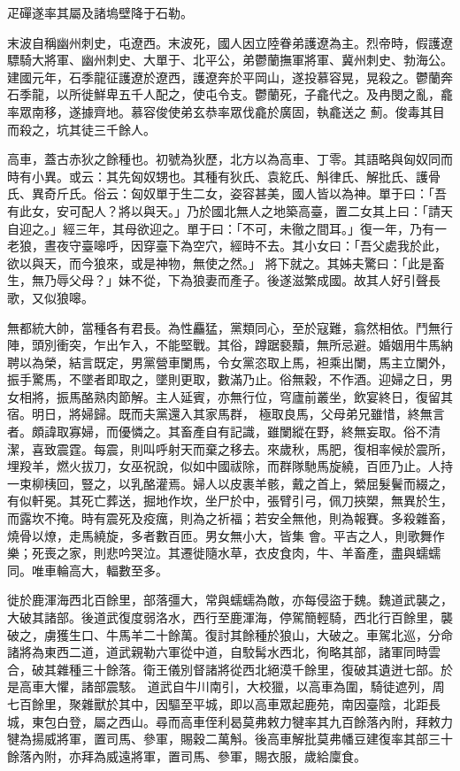 \begin{pinyinscope}
 疋磾遂率其屬及諸塢壁降于石勒。



 末波自稱幽州刺史，屯遼西。末波死，國人因立陸眷弟護遼為主。烈帝時，假護遼驃騎大將軍、幽州刺史、大單于、北平公，弟鬱蘭撫軍將軍、冀州刺史、勃海公。建國元年，石季龍征護遼於遼西，護遼奔於平岡山，遂投慕容晃，晃殺之。鬱蘭奔石季龍，以所徙鮮卑五千人配之，使屯令支。鬱蘭死，子龕代之。及冉閔之亂，龕率眾南移，遂據齊地。慕容俊使弟玄恭率眾伐龕於廣固，執龕送之
 薊。俊毒其目而殺之，坑其徒三千餘人。



 高車，蓋古赤狄之餘種也。初號為狄歷，北方以為高車、丁零。其語略與匈奴同而時有小異。或云：其先匈奴甥也。其種有狄氏、袁紇氏、斛律氏、解批氏、護骨氏、異奇斤氏。俗云：匈奴單于生二女，姿容甚美，國人皆以為神。單于曰：「吾有此女，安可配人？將以與天。」乃於國北無人之地築高臺，置二女其上曰：「請天自迎之。」經三年，其母欲迎之。單于曰：「不可，未徹之間耳。」復一年，乃有一老狼，晝夜守臺嗥呼，因穿臺下為空穴，經時不去。其小女曰：「吾父處我於此，欲以與天，而今狼來，或是神物，無使之然。」
 將下就之。其姊夫驚曰：「此是畜生，無乃辱父母？」妹不從，下為狼妻而產子。後遂滋繁成國。故其人好引聲長歌，又似狼嗥。



 無都統大帥，當種各有君長。為性麤猛，黨類同心，至於寇難，翕然相依。鬥無行陣，頭別衝突，乍出乍入，不能堅戰。其俗，蹲踞褻黷，無所忌避。婚姻用牛馬納聘以為榮，結言既定，男黨營車闌馬，令女黨恣取上馬，袒乘出闌，馬主立闌外，振手驚馬，不墜者即取之，墜則更取，數滿乃止。俗無穀，不作酒。迎婦之日，男女相將，振馬酪熟肉節解。主人延賓，亦無行位，穹廬前叢坐，飲宴終日，復留其宿。明日，將婦歸。既而夫黨還入其家馬群，
 極取良馬，父母弟兄雖惜，終無言者。頗諱取寡婦，而優憐之。其畜產自有記識，雖闌縱在野，終無妄取。俗不清潔，喜致震霆。每震，則叫呼射天而棄之移去。來歲秋，馬肥，復相率候於震所，埋羖羊，燃火拔刀，女巫祝說，似如中國祓除，而群隊馳馬旋繞，百匝乃止。人持一束柳桋回，豎之，以乳酪灌焉。婦人以皮裹羊骸，戴之首上，縈屈髮鬢而綴之，有似軒冕。其死亡葬送，掘地作坎，坐尸於中，張臂引弓，佩刀挾槊，無異於生，而露坎不掩。時有震死及疫癘，則為之祈福；若安全無他，則為報賽。多殺雜畜，燒骨以燎，走馬繞旋，多者數百匝。男女無小大，皆集
 會。平吉之人，則歌舞作樂；死喪之家，則悲吟哭泣。其遷徙隨水草，衣皮食肉，牛、羊畜產，盡與蠕蠕同。唯車輪高大，輻數至多。



 徙於鹿渾海西北百餘里，部落彊大，常與蠕蠕為敵，亦每侵盜于魏。魏道武襲之，大破其諸部。後道武復度弱洛水，西行至鹿渾海，停駕簡輕騎，西北行百餘里，襲破之，虜獲生口、牛馬羊二十餘萬。復討其餘種於狼山，大破之。車駕北巡，分命諸將為東西二道，道武親勒六軍從中道，自駮髯水西北，徇略其部，諸軍同時雲合，破其雜種三十餘落。衛王儀別督諸將從西北絕漠千餘里，復破其遺迸七部。於是高車大懼，諸部震駭。
 道武自牛川南引，大校獵，以高車為圍，騎徒遮列，周七百餘里，聚雜獸於其中，因驅至平城，即以高車眾起鹿苑，南因臺陰，北距長城，東包白登，屬之西山。尋而高車侄利曷莫弗敕力犍率其九百餘落內附，拜敕力犍為揚威將軍，置司馬、參軍，賜穀二萬斛。後高車解批莫弗幡豆建復率其部三十餘落內附，亦拜為威遠將軍，置司馬、參軍，賜衣服，歲給廩食。




\end{pinyinscope}
